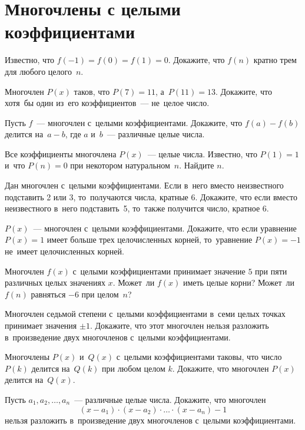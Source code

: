 
\section*{Многочлены с целыми коэффициентами}


\begin{problems}

\item
Известно, что $f(-1) = f(0) = f(1) = 0$.
Докажите, что $f(n)$ кратно трем для любого целого~$n$.

\item
Многочлен $P(x)$ таков, что $P(7) = 11$, а~$P(11) = 13$.
Докажите, что хотя~бы один из~его коэффициентов~--- не~целое число.

\item
Пусть $f$~--- многочлен с~целыми коэффициентами.
Докажите, что $f(a) - f(b)$ делится на~$a - b$, где $a$ и~$b$~--- различные
целые числа.

\item
Все коэффициенты многочлена $P(x)$~--- целые числа.
Известно, что $P(1) = 1$ и~что $P(n) = 0$ при некотором натуральном~$n$.
Найдите $n$.

\item
Дан многочлен с~целыми коэффициентами.
Если в~него вместо неизвестного подставить 2 или 3, то~получаются числа,
кратные 6.
Докажите, что если вместо неизвестного в~него подставить~5, то~также получится
число, кратное 6.

\item
$P(x)$~--- многочлен с~целыми коэффициентами.
Докажите, что если уравнение $P(x) = 1$ имеет больше трех целочисленных корней,
то~уравнение $P(x) = -1$ не~имеет целочисленных корней.

\item
Многочлен $f(x)$ с~целыми коэффициентами принимает значение $5$ при пяти
различных целых значениях $x$.
Может~ли $f(x)$ иметь целые корни?
Может~ли $f(n)$ равняться $-6$ при целом~$n$?

\item
Многочлен седьмой степени с~целыми коэффициентами в~семи целых точках принимает
значения $\pm 1$.
Докажите, что этот многочлен нельзя разложить в~произведение двух многочленов
с~целыми коэффициентами.

\item
Многочлены $P(x)$ и~$Q(x)$ с~целыми коэффициентами таковы, что число $P(k)$
делится на~$Q(k)$ при любом целом $k$.
Докажите, что многочлен $P(x)$ делится на~$Q(x)$.

\item
Пусть $a_1, a_2, \ldots, a_n$~--- различные целые числа.
Докажите, что многочлен
\[
    (x - a_1) \cdot (x - a_2) \cdot \ldots \cdot (x - a_n) - 1
\]
нельзя разложить в~произведение двух многочленов с~целыми коэффициентами.

\end{problems}


